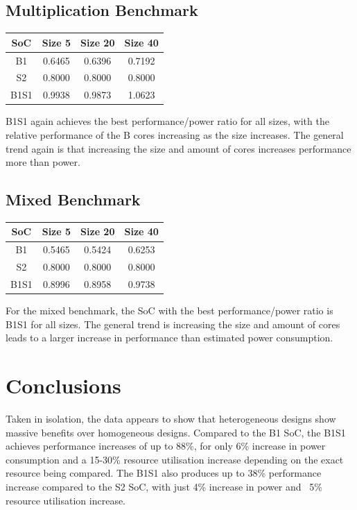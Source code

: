 \subsection{Multiplication Benchmark}
\begin{center}
\begin{tabular}{c c c c}
    SoC & Size 5 & Size 20 & Size 40 \\
    \hline
    B1 & 0.6465 & 0.6396 & 0.7192 \\
    \hline
    S2 & 0.8000 & 0.8000 & 0.8000 \\
    \hline
    B1S1 & 0.9938 & 0.9873 & 1.0623\\
    \hline
\end{tabular}
\end{center}
B1S1 again achieves the best performance/power ratio for all sizes, with the relative performance of the B cores increasing as the size increases. The general trend again is that increasing the size and amount of cores increases performance more than power.

\subsection{Mixed Benchmark}
\begin{center}
\begin{tabular}{c c c c}
    SoC & Size 5 & Size 20 & Size 40 \\
    \hline
    B1 & 0.5465 & 0.5424 & 0.6253 \\
    \hline
    S2 & 0.8000 & 0.8000 & 0.8000 \\
    \hline
    B1S1 & 0.8996 & 0.8958 & 0.9738\\
    \hline
\end{tabular}
\end{center}
For the mixed benchmark, the SoC with the best performance/power ratio is B1S1 for all sizes. The general trend is increasing the size and amount of cores leads to a larger increase in performance than estimated power consumption.

\section{Conclusions}
\label{sec:conclusion}
Taken in isolation, the data appears to show that heterogeneous designs show massive benefits over homogeneous designs. Compared to the B1 SoC, the B1S1 achieves performance increases of up to 88\%, for only 6\% increase in power consumption and a 15-30\% resource utilisation increase depending on the exact resource being compared. The B1S1 also produces up to 38\% performance increase compared to the S2 SoC, with just 4\% increase in power and ~5\% resource utilisation increase. 

